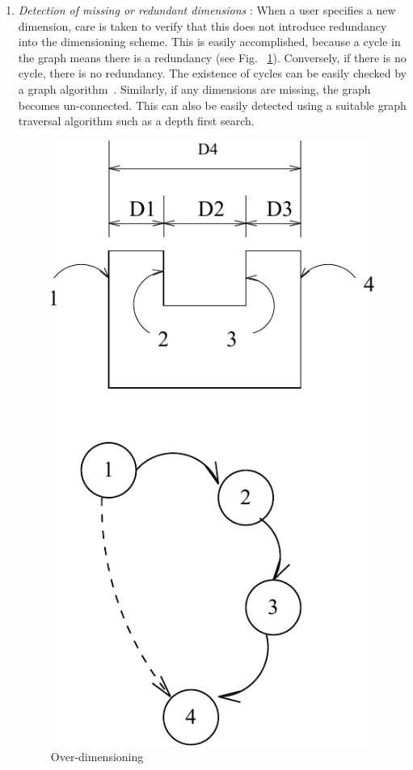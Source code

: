 \begin{enumerate}
    \item
    {\em Detection of missing or redundant dimensions} :
        When a user specifies a new dimension, care is taken to verify that this
        does not introduce redundancy into the dimensioning scheme. This is
		easily accomplished, because a cycle in the graph means there is a
		redundancy (see Fig. ~\ref{ovrdim}). Conversely, if there is no cycle, 
		there is no 
		redundancy. The existence of cycles can be easily checked by a graph
		algorithm~\cite{Rein}. Similarly, if any dimensions are missing, the 
		graph becomes
		un-connected. This can also be easily detected using a suitable graph
		traversal algorithm such as a depth first search.

        \begin{figure}[htbp]
            	            \hspace{4cm}
            \includegraphics{OVRDIM.pdf}
            \caption{Over-dimensioning}
            \label{ovrdim}
        \end{figure}


\end{enumerate}
